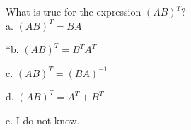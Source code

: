
What is true for the expression $(AB)^{T}$?\\

a. $ (AB)^{T} = BA $

*b. $ (AB)^{T} = B^{T}A^{T} $

c. $ (AB)^{T} = (BA)^{-1} $

d. $ (AB)^{T} = A^{T} + B^{T} $

e. I do not know.\\
